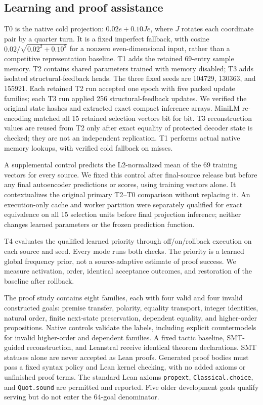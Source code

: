 \documentclass{article}
\begin{document}
\subsection{Learning and proof assistance}
T0 is the native cold projection: $0.02e+0.10Je$, where $J$ rotates each coordinate pair by a quarter turn. It is a fixed imperfect fallback, with cosine $0.02/\sqrt{0.02^2+0.10^2}$ for a nonzero even-dimensional input, rather than a competitive representation baseline. T1 adds the retained 69-entry sample memory. T2 contains shared parameters trained with memory disabled; T3 adds isolated structural-feedback heads. The three fixed seeds are 104729, 130363, and 155921. Each retained T2 run accepted one epoch with five packed update families; each T3 run applied 256 structural-feedback updates. We verified the original state hashes and extracted exact compact inference arrays. MiniLM re-encoding matched all 15 retained selection vectors bit for bit. T3 reconstruction values are reused from T2 only after exact equality of protected decoder state is checked; they are not an independent replication. T1 performs actual native memory lookups, with verified cold fallback on misses.

A supplemental control predicts the L2-normalized mean of the 69 training vectors for every source. We fixed this control after final-source release but before any final autoencoder predictions or scores, using training vectors alone. It contextualizes the original primary T2--T0 comparison without replacing it. An execution-only cache and worker partition were separately qualified for exact equivalence on all 15 selection units before final projection inference; neither changes learned parameters or the frozen prediction function.

T4 evaluates the qualified learned priority through off/on/rollback execution on each source and seed. Every mode runs both checks. The priority is a learned global frequency prior, not a source-adaptive estimate of proof success. We measure activation, order, identical acceptance outcomes, and restoration of the baseline after rollback.

The proof study contains eight families, each with four valid and four invalid constructed goals: premise transfer, polarity, equality transport, integer identities, natural order, finite next-state preservation, dependent equality, and higher-order propositions. Native controls validate the labels, including explicit countermodels for invalid higher-order and dependent families. A fixed tactic baseline, SMT-guided reconstruction, and Leanstral receive identical theorem declarations. SMT statuses alone are never accepted as Lean proofs. Generated proof bodies must pass a fixed syntax policy and Lean kernel checking, with no added axioms or unfinished proof terms. The standard Lean axioms \texttt{propext}, \texttt{Classical.choice}, and \texttt{Quot.sound} are permitted and reported. Five older development goals qualify serving but do not enter the 64-goal denominator.
\end{document}
